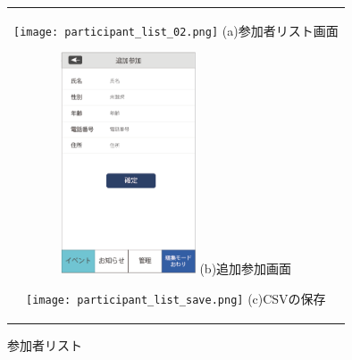 \begin{figure}[htbp]
  \begin{center}
    \begin{tabular}{c}

      \begin{minipage}{0.33\hsize}
        \begin{center}
\texttt{[image: participant\_list\_02.png]}
          \hspace{1cm} %
          {\footnotesize (a)参加者リスト画面}
        \end{center}
      \end{minipage}

      \begin{minipage}{0.33\hsize}
        \begin{center}
\includegraphics[width=4cm]{participant_add.png}
          \hspace{1cm}%
          {\footnotesize (b)追加参加画面}
        \end{center}
      \end{minipage}

      \begin{minipage}{0.33\hsize}
        \begin{center}
\texttt{[image: participant\_list\_save.png]}
          \hspace{1cm}%
          {\footnotesize (c)CSVの保存}
        \end{center}
      \end{minipage}

    \end{tabular}
    \caption{参加者リスト}
    \label{tab:joinedlist}
  \end{center}
\end{figure}

